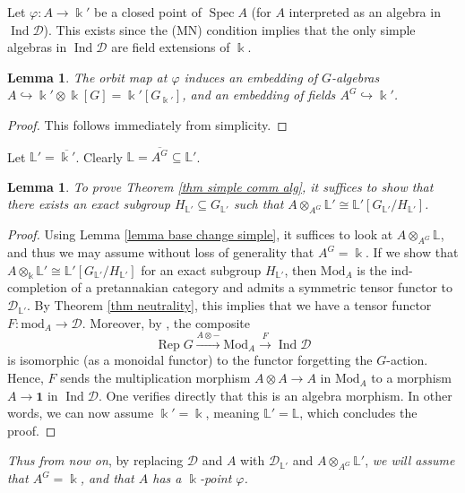 \documentclass[11pt]{amsart}
\def\Ind{\operatorname{Ind}}
\def\Ds{\mathscr{D}}
\def\bk{\Bbbk}
\def\mod{\mathrm{ mod}}
\def\Rep{\operatorname{Rep}}
\def\Spec{\operatorname{Spec}}
\def\Mod{\mathrm{Mod}}
\def\sub{\subseteq}
\newcommand{\mL}{\mathbb{L}}
\newtheorem{lemma}[thm]{Lemma}
\theoremstyle{definition}
\theoremstyle{remark}
\numberwithin{equation}{section}
\newcommand{\unit}{\mathbf{1}}
\begin{document}
     Let $\varphi:A\to \Bbbk'$ be a closed point of $\Spec A$ (for $A$ interpreted as an algebra in $\Ind\Ds$). This exists since the (MN) condition implies that the only simple algebras in $\Ind\Ds$ are field extensions of $\bk$.

    \begin{lemma}\label{lemma orbit embedding}
        The orbit map at $\varphi$ induces an embedding of $G$-algebras $A\hookrightarrow\Bbbk'\otimes\bk[G]=\bk'[G_{\bk'}]$, and an embedding of fields $A^G\hookrightarrow \Bbbk'$.  
    \end{lemma}

    \begin{proof}
        This follows immediately from simplicity.
    \end{proof}

Let $\mathbb{L}'=\overline{\Bbbk'}$.  Clearly $\mathbb{L}=\overline{A^G}\sub \mathbb{L}'$.

\begin{lemma}\label{lem:extscal}
    To prove Theorem \ref{thm simple comm alg}, it suffices to show that there exists an exact subgroup $H_{\mathbb{L}'}\sub G_{\mathbb{L}'}$ such that $A\otimes_{A^G}\mathbb{L}'\cong\mathbb{L}'[G_{\mathbb{L}'}/H_{\mathbb{L}'}]$.
\end{lemma}

    \begin{proof}
        Using Lemma \ref{lemma base change simple}, it suffices to look at $A\otimes_{A^G}\mL$, and thus we may assume without loss of generality that $A^G=\Bbbk$.  If we show that $A\otimes_{\Bbbk}\mathbb{L}'\cong\mathbb{L}'[G_{\mathbb{L}'}/H_{\mathbb{L}'}]$ for an exact subgroup $H_{\mathbb{L}'}$, then $\Mod_A$ is the ind-completion of a pretannakian category and admits a symmetric tensor functor to $\Ds_{\mathbb{L}'}$.  By Theorem \ref{thm neutrality}, this implies that we have a tensor functor $F:\mod_A\to\Ds$. Moreover, by \cite[Theorem~7.3.1]{CEO}, the composite 
    \[\Rep G\xrightarrow{A\otimes -}\Mod_A\xrightarrow{F}\Ind\Ds \]
        is isomorphic (as a monoidal functor) to the functor forgetting the $G$-action. Hence, $F$ sends the multiplication morphism $A\otimes A\to A$ in $\Mod_A$ to a morphism $A\to \unit$ in $\Ind\Ds$. One verifies directly that this is an algebra morphism. In other words, we can now assume $\bk'=\bk$, meaning $\mathbb{L}'=\mathbb{L}$, which concludes the proof.   \end{proof}

    {\em Thus from now on}, by replacing $\Ds$ and $A$ with $\Ds_{\mathbb{L}'}$ and $ A\otimes_{A^G}\mathbb{L}'$, {\em we will assume that $A^G=\Bbbk$, and that $A$ has a $\Bbbk$-point $\varphi$.	}
	
\end{document}
